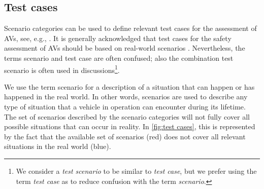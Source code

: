 \documentclass[twoside,twocolumn,9pt]{extarticle}
\theoremstyle{plain}
\begin{document}
\subsection{Test cases}
\label{sec:test cases}

Scenario categories can be used to define relevant test cases for the assessment of AVs, see, e.g., \cite{ploeg2018cetran,elrofai2016scenario}. It is generally acknowledged that test cases for the safety assessment of AVs should be based on real-world scenarios \cite{putz2017pegasus, roesener2016scenariobased, deGelder2017assessment}. Nevertheless, the terms scenario and test case are often confused; also the combination test scenario is often used in discussions\footnote{We consider a \emph{test scenario} to be similar to \emph{test case}, but we prefer using the term \emph{test case} as to reduce confusion with the term \emph{scenario}.}. %

We use the term scenario for a description of a situation that can happen or has happened in the real world. In other words, scenarios are used to describe any type of situation that a vehicle in operation can encounter during its lifetime. The set of scenarios described by the scenario categories will not fully cover all possible situations that can occur in reality. In \cref{fig:test cases}, this is represented by the fact that the available set of scenarios (red) does not cover all relevant situations in the real world (blue).
\end{document}
